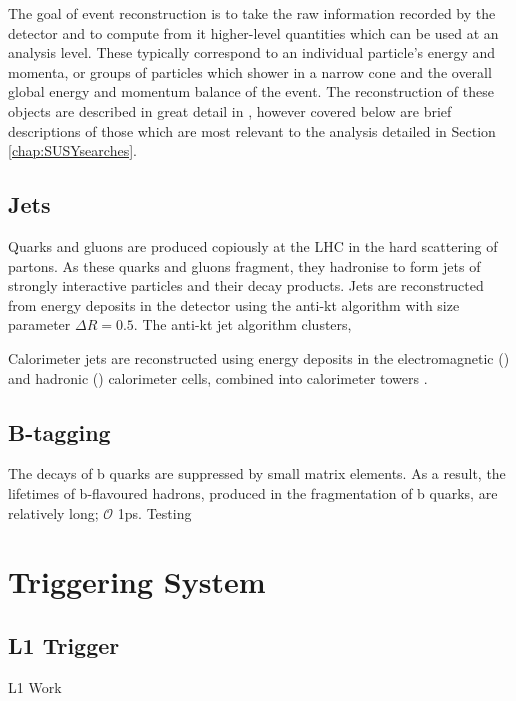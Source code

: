 The goal of event reconstruction is to take the raw information recorded by the detector and to compute from it higher-level quantities which can be used at an analysis level. These typically correspond to an individual particle's energy and momenta, or groups of particles which shower in a narrow cone and the overall global energy and momentum balance of the event. The reconstruction of these objects are described in great detail in \cite{CMS_TDR_PHYS_vol1}, however covered below are brief descriptions of those which are most relevant to the analysis detailed in Section \ref{chap:SUSYsearches}.

\subsection{Jets}
\label{subsec:cmsobjects-jets}

Quarks and gluons are produced copiously at the LHC in the hard scattering of partons. As these quarks and gluons fragment, they hadronise to form jets of strongly interactive particles and their decay products.  Jets are reconstructed from energy deposits in the detector using the anti-kt algorithm \cite{antiktalgo} with size parameter $\Delta R = 0.5$. The anti-kt jet algorithm clusters, 

Calorimeter jets are reconstructed using energy deposits in the electromagnetic (\ECAL) and hadronic (\HCAL) calorimeter cells, combined into calorimeter towers  \cite{Janssen:1322145}.


\subsection{B-tagging}
\label{subsec:cmsobjects-btagging}

The decays of b quarks are suppressed by small \CKM matrix elements. As a result, the lifetimes of b-flavoured hadrons, produced in the fragmentation of b quarks, are relatively long; $\mathcal{O}$ 1ps. Testing

\section{Triggering System}
\label{sec:triggersystem}

\subsection{L1 Trigger}
\label{subsec:l1trigger}

L1 Work
